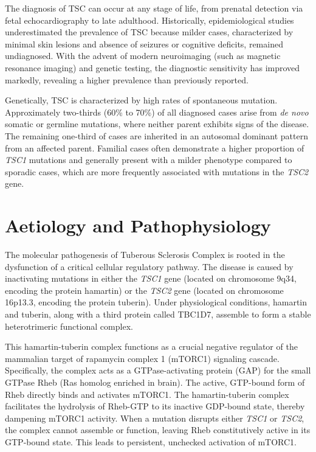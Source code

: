 The diagnosis of TSC can occur at any stage of life, from prenatal detection via fetal echocardiography to late adulthood. Historically, epidemiological studies underestimated the prevalence of TSC because milder cases, characterized by minimal skin lesions and absence of seizures or cognitive deficits, remained undiagnosed. With the advent of modern neuroimaging (such as magnetic resonance imaging) and genetic testing, the diagnostic sensitivity has improved markedly, revealing a higher prevalence than previously reported.

Genetically, TSC is characterized by high rates of spontaneous mutation. Approximately two-thirds (60\% to 70\%) of all diagnosed cases arise from \textit{de novo} somatic or germline mutations, where neither parent exhibits signs of the disease. The remaining one-third of cases are inherited in an autosomal dominant pattern from an affected parent. Familial cases often demonstrate a higher proportion of \textit{TSC1} mutations and generally present with a milder phenotype compared to sporadic cases, which are more frequently associated with mutations in the \textit{TSC2} gene.

\section*{Aetiology and Pathophysiology}
The molecular pathogenesis of Tuberous Sclerosis Complex is rooted in the dysfunction of a critical cellular regulatory pathway. The disease is caused by inactivating mutations in either the \textit{TSC1} gene (located on chromosome 9q34, encoding the protein hamartin) or the \textit{TSC2} gene (located on chromosome 16p13.3, encoding the protein tuberin). Under physiological conditions, hamartin and tuberin, along with a third protein called TBC1D7, assemble to form a stable heterotrimeric functional complex.

This hamartin-tuberin complex functions as a crucial negative regulator of the mammalian target of rapamycin complex 1 (mTORC1) signaling cascade. Specifically, the complex acts as a GTPase-activating protein (GAP) for the small GTPase Rheb (Ras homolog enriched in brain). The active, GTP-bound form of Rheb directly binds and activates mTORC1. The hamartin-tuberin complex facilitates the hydrolysis of Rheb-GTP to its inactive GDP-bound state, thereby dampening mTORC1 activity. When a mutation disrupts either \textit{TSC1} or \textit{TSC2}, the complex cannot assemble or function, leaving Rheb constitutively active in its GTP-bound state. This leads to persistent, unchecked activation of mTORC1.

